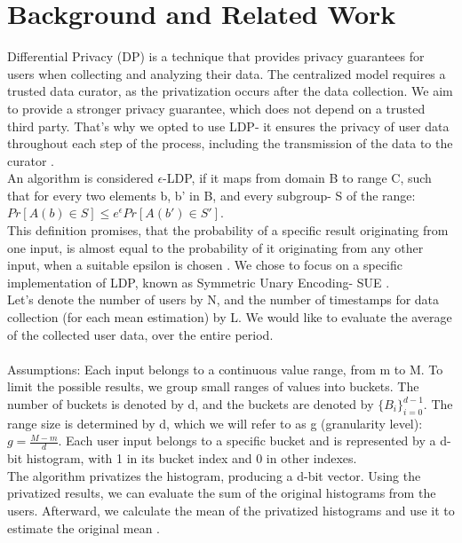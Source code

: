 \documentclass[sigconf]{acmart}
\begin{document}
\section{Background and Related Work}
Differential Privacy (DP) is a technique that provides privacy guarantees for users when collecting and analyzing their data. The centralized model requires a trusted data curator, as the privatization occurs after the data collection. We aim to provide a stronger privacy guarantee, which does not depend on a trusted third party. That's why we opted to use LDP- it ensures the privacy of user data throughout each step of the process, including the transmission of the data to the curator \cite{1_dwork2014algorithmic}.\\
An algorithm is considered $\epsilon$-LDP, if it maps from domain B to range C, such that for every two elements b, b' in B, and every subgroup- S of the range: $Pr\left[A(b)\in S\right] \leq e^{\epsilon}Pr\left[A(b')\in S'\right]$.\\ This definition promises, that the probability of a specific result originating from one input, is almost equal to the probability of it originating from any other input, when a suitable epsilon is chosen \cite{2_ding2017collecting}. We chose to focus on a specific implementation of LDP, known as Symmetric Unary Encoding- SUE \cite{3_wang2020comprehensive}.\\
Let's denote the number of users by N, and the number of timestamps for data collection (for each mean estimation) by L. We would like to evaluate the average of the collected user data, over the entire period. \\\\
Assumptions: Each input belongs to a continuous value range, from m to M. To limit the possible results, we group small ranges of values into buckets. The number of buckets is denoted by d, and the buckets are denoted by $\{B_i\}_{i=0}^{d-1}$. The range size is determined by d, which we will refer to as g (granularity level): $g=\frac{M-m}{d}$. Each user input belongs to a specific bucket and is represented by a d-bit histogram, with 1 in its bucket index and 0 in other indexes.\\
The algorithm privatizes the histogram, producing a d-bit vector. Using the privatized results, we can evaluate the sum of the original histograms from the users. Afterward, we calculate the mean of the privatized histograms and use it to estimate the original mean \cite{2_ding2017collecting}.\\\\
\end{document}
